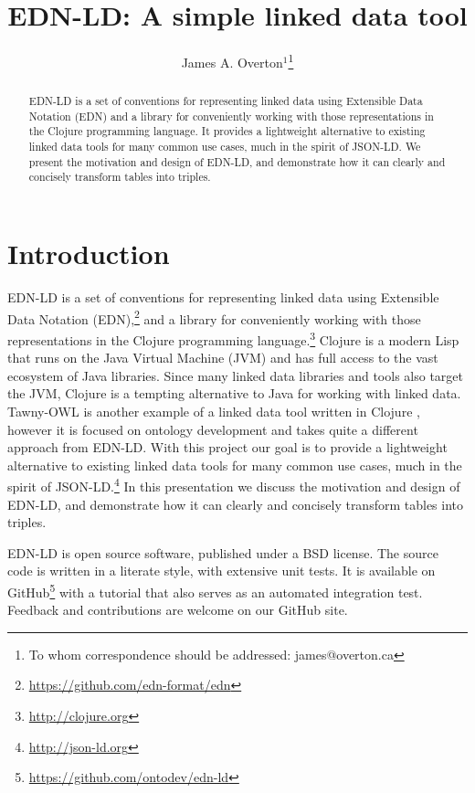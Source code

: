 \documentclass{icbo}
\begin{document}
\title[EDN-LD]{EDN-LD: A simple linked data tool}
\author[Overton]{James A. Overton$^{1}$\footnote{To whom correspondence should be addressed: james@overton.ca}}
\address{$^{1}$Knocean, Toronto, Ontario, Canada}

\maketitle

\begin{abstract}
EDN-LD is a set of conventions for representing linked data using Extensible Data Notation (EDN) and a library for conveniently working with those representations in the Clojure programming language. It provides a lightweight alternative to existing linked data tools for many common use cases, much in the spirit of JSON-LD. We present the motivation and design of EDN-LD, and demonstrate how it can clearly and concisely transform tables into triples.
\end{abstract}


\section{Introduction}

EDN-LD is a set of conventions for representing linked data using Extensible Data Notation (EDN),\footnote{\url{https://github.com/edn-format/edn}} and a library for conveniently working with those representations in the Clojure programming language.\footnote{\url{http://clojure.org}} Clojure is a modern Lisp that runs on the Java Virtual Machine (JVM) and has full access to the vast ecosystem of Java libraries. Since many linked data libraries and tools also target the JVM, Clojure is a tempting alternative to Java for working with linked data. Tawny-OWL is another example of a linked data tool written in Clojure \citep{Lord2013}, however it is focused on ontology development and takes quite a different approach from EDN-LD. With this project our goal is to provide a lightweight alternative to existing linked data tools for many common use cases, much in the spirit of JSON-LD.\footnote{\url{http://json-ld.org}} In this presentation we discuss the motivation and design of EDN-LD, and demonstrate how it can clearly and concisely transform tables into triples.

EDN-LD is open source software, published under a BSD license. The source code is written in a literate style, with extensive unit tests. It is available on GitHub\footnote{\url{https://github.com/ontodev/edn-ld}} with a tutorial that also serves as an automated integration test. Feedback and contributions are welcome on our GitHub site.
\end{document}
